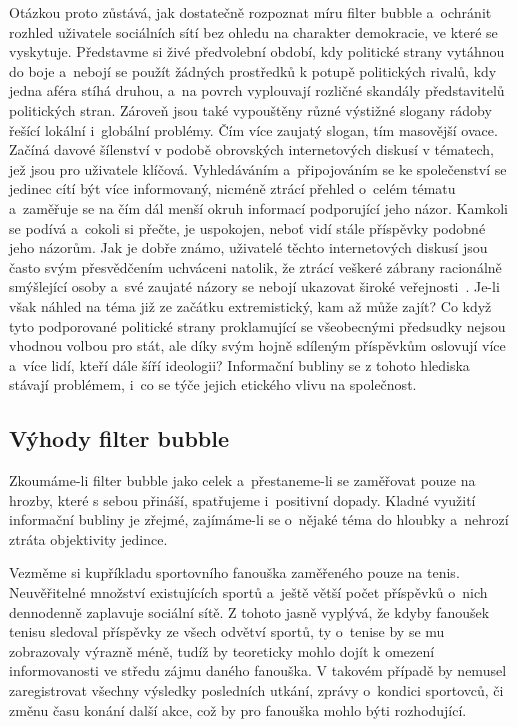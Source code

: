 \documentclass[12pt, a4paper]{article}
\numberwithin{equation}{section} 	%
\begin{document}
Otázkou proto zůstává, jak dostatečně rozpoznat míru filter bubble a~ochránit rozhled uživatele sociálních sítí bez ohledu na charakter demokracie, ve které se vyskytuje. Představme si živé předvolební období, kdy politické strany vytáhnou do boje a~nebojí se použít žádných prostředků k potupě politických rivalů, kdy jedna aféra stíhá druhou, a~na povrch vyplouvají rozličné skandály představitelů politických stran. Zároveň jsou také vypouštěny různé výstižné slogany rádoby řešící lokální i~globální problémy. Čím více zaujatý slogan, tím masovější ovace. Začíná davové šílenství v podobě obrovských internetových diskusí v tématech, jež jsou pro uživatele klíčová. Vyhledáváním a~připojováním se ke společenství se jedinec cítí být více informovaný, nicméně ztrácí přehled o~celém tématu a~zaměřuje se na čím dál menší okruh informací podporující jeho názor. Kamkoli se podívá a~cokoli si přečte, je uspokojen, neboť vidí stále příspěvky podobné jeho názorům. Jak je dobře známo, uživatelé těchto internetových diskusí jsou často svým přesvědčením uchváceni natolik, že ztrácí veškeré zábrany racionálně smýšlející osoby a~své zaujaté názory se nebojí ukazovat široké veřejnosti~\cite{DemocracyOnline}. Je-li však náhled na téma již ze začátku extremistický, kam až může zajít? Co když tyto podporované politické strany proklamující se všeobecnými předsudky nejsou vhodnou volbou pro stát, ale díky svým hojně sdíleným příspěvkům oslovují více a~více lidí, kteří dále šíří ideologii? Informační bubliny se z tohoto hlediska stávají problémem, i~co se týče jejich etického vlivu na společnost.


\subsection{Výhody filter bubble}
\noindent Zkoumáme-li filter bubble jako celek a~přestaneme-li se zaměřovat pouze na hrozby, které s sebou přináší, spatřujeme i~positivní dopady. Kladné využití informační bubliny je zřejmé, zajímáme-li se o~nějaké téma do hloubky a~nehrozí ztráta objektivity jedince.

Vezměme si kupříkladu sportovního fanouška zaměřeného pouze na tenis. Neuvěřitelné množství existujících sportů a~ještě větší počet příspěvků o~nich dennodenně zaplavuje sociální sítě. Z tohoto jasně vyplývá, že kdyby fanoušek tenisu sledoval příspěvky ze všech odvětví sportů, ty o~tenise by se mu zobrazovaly výrazně méně, tudíž by teoreticky mohlo dojít k omezení informovanosti ve středu zájmu daného fanouška. V takovém případě by nemusel zaregistrovat všechny výsledky posledních utkání, zprávy o~kondici sportovců, či změnu času konání další akce, což by pro fanouška mohlo býti rozhodující.
\end{document}
